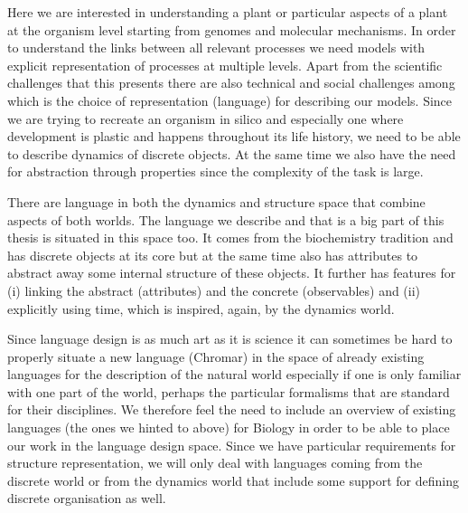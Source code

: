 \documentclass[phd]{infthesis}
\begin{document}

Here we are interested in understanding a plant or particular aspects of a plant
at the organism level starting from genomes and molecular mechanisms. In order
to understand the links between all relevant processes we need models with
explicit representation of processes at multiple levels. Apart from the
scientific challenges that this presents there are also technical and social
challenges among which is the choice of representation (language) for describing
our models. Since we are trying to recreate an organism in silico and especially
one where development is plastic and happens throughout its life history, we
need to be able to describe dynamics of discrete objects. At the same time we
also have the need for abstraction through properties since the complexity of
the task is large.

There are language in both the dynamics and structure space that combine aspects
of both worlds. The language we describe and that is a big part of this thesis
is situated in this space too. It comes from the biochemistry tradition and has
discrete objects at its core but at the same time also has attributes
to abstract away some internal structure of these objects. It further has
features for (i) linking the abstract (attributes) and the concrete
(observables) and (ii) explicitly using time, which is inspired, again, by the dynamics
world.

Since language design is as much art as it is science it can sometimes be hard
to properly situate a new language (Chromar) in the space of already existing languages for the
description of the natural world especially if one is only familiar with one
part of the world, perhaps the particular formalisms that are standard for their
disciplines. We therefore feel the need to include an overview of existing
languages (the ones we hinted to above) for Biology in order to be able to place
our work in the language design space. Since we have particular requirements for
structure representation, we will only deal with languages coming from the
discrete world or from the dynamics world that include some support for defining
discrete organisation as well.
\end{document}
